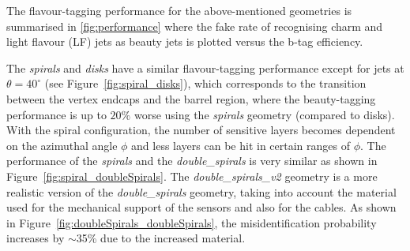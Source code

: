 The flavour-tagging performance for the above-mentioned geometries is
summarised in \cref{fig:performance} where the fake rate of
recognising charm and light flavour (LF) jets as beauty jets is
plotted versus the b-tag efficiency.

The \emph{spirals} and \emph{disks} have a similar flavour-tagging
performance except for jets at $\theta=40^{\circ}$ (see
Figure~\ref{fig:spiral_disks}), which corresponds to the transition
between the vertex endcaps and the barrel region, where the
beauty-tagging performance is up to $20\%$ worse using the
\emph{spirals} geometry (compared to disks). With the spiral
configuration, the number of sensitive layers becomes dependent on the
azimuthal angle $\phi$ and less layers can be hit in certain ranges of
$\phi$. The performance of the \emph{spirals} and the
\emph{double\_spirals} is very similar as shown in
Figure~\ref{fig:spiral_doubleSpirals}.  The \emph{double\_spirals\_v2}
geometry is a more realistic version of the \emph{double\_spirals}
geometry, taking into account the material used for the mechanical
support of the sensors and also for the cables. As shown in
Figure~\ref{fig:doubleSpirals_doubleSpirals}, the misidentification
probability increases by $\sim$35\% due to the increased material.



